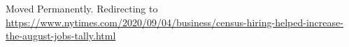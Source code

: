 Moved Permanently. Redirecting to
\url{https://www.nytimes.com/2020/09/04/business/census-hiring-helped-increase-the-august-jobs-tally.html}
